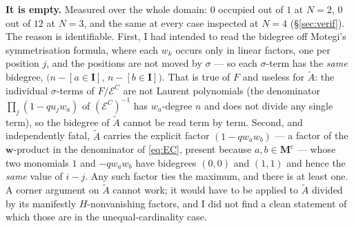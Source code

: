\documentclass[11pt]{article}
\theoremstyle{plain}
\theoremstyle{definition}
\theoremstyle{remark}
\theoremstyle{plain}
\newcommand{\bI}{\mathbf{I}}
\newcommand{\bM}{\mathbf{M}}
\newcommand{\bw}{\mathbf{w}}
\newcommand{\At}{\widetilde{A}}
\begin{document}
\textbf{It is empty.}  Measured over the whole domain: $0$ occupied out of $1$
at $N=2$, $0$ out of $12$ at $N=3$, and the same at every case inspected at
$N=4$ (\S\ref{sec:verif}).  The reason is identifiable.  First, I had intended
to read the bidegree off Motegi's symmetrisation formula, where each $w_k$
occurs only in linear factors, one per position $j$, and the positions are not
moved by $\sigma$ --- so each $\sigma$-term has the \emph{same} bidegree,
$\bigl(n-[a\in\bI],\,n-[b\in\bI]\bigr)$.  That is true of $F$ and useless for
$\At$: the individual $\sigma$-terms of $F/\mathcal{E}^C$ are not Laurent
polynomials (the denominator $\prod_{j}(1-qu_jw_a)$ of
$(\mathcal{E}^C)^{-1}$ has $w_a$-degree $n$ and does not divide any single
term), so the bidegree of $\At$ cannot be read term by term.  Second, and
independently fatal, $\At$ carries the explicit factor $(1-qw_aw_b)$ --- a
factor of the $\bw$-product in the denominator of \eqref{eq:EC}, present
because $a,b\in\bM^{\mathrm{c}}$ --- whose two monomials $1$ and $-qw_aw_b$ have
bidegrees $(0,0)$ and $(1,1)$ and hence the \emph{same} value of $i-j$.  Any
such factor ties the maximum, and there is at least one.  A corner argument on
$\At$ cannot work; it would have to be applied to $\At$ divided by its
manifestly $H$-nonvanishing factors, and I did not find a clean statement of
which those are in the unequal-cardinality case.
\end{document}
